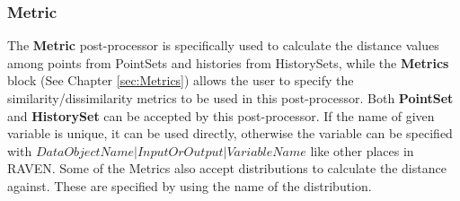 \subsubsection{Metric}
\label{MetricPP}
The \textbf{Metric} post-processor is specifically used to calculate the distance values among points from PointSets and histories from HistorySets,
while the \textbf{Metrics} block (See Chapter \ref{sec:Metrics}) allows the user to specify the similarity/dissimilarity metrics to be used in this
post-processor. Both \textbf{PointSet} and \textbf{HistorySet} can be accepted by this post-processor.
If the name of given variable is unique, it can be used directly, otherwise the variable can be specified
with $DataObjectName|InputOrOutput|VariableName$ like other places in RAVEN.
Some of the Metrics also accept distributions to calculate the distance against.
These are specified by using the name of the distribution.
%
%
